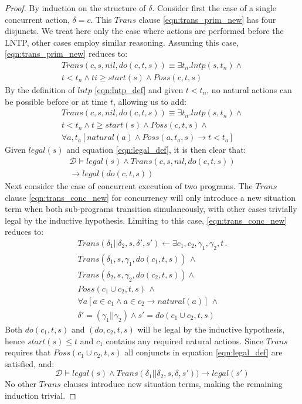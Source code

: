 \documentclass[letterpaper]{article}
\begin{document}
\begin{proof}
By induction on the structure of $\delta$.
Consider first the case of a single concurrent action, $\delta=c$.  This
$Trans$ clause \ref{eqn:trans_prim_new} has four disjuncts. We treat
here only the
case where actions are performed before the LNTP, other
cases employ similar reasoning.
Assuming this case, \ref{eqn:trans_prim_new} reduces to:
\begin{multline*}
Trans(c,s,nil,do(c,t,s)) \equiv \exists t_n . lntp(s,t_n) \wedge \\
  t < t_n \wedge ti \geq start(s) \wedge Poss(c,t,s)
\end{multline*}
By the definition of $lntp$ \ref{eqn:lntp_def} and given $t < t_n$,
no natural actions
can be possible before or at time $t$, allowing us to add:
\begin{multline*}
Trans(c,s,nil,do(c,t,s)) \equiv \exists t_n . lntp(s,t_n) \wedge \\
  t < t_n \wedge t \geq start(s) \wedge Poss(c,t,s) \wedge\\
  \forall a,t_a \left[ natural(a) \wedge Poss(a,t_a,s) \rightarrow t < t_a \right]
\end{multline*}
Given $legal(s)$ and equation \ref{eqn:legal_def}, it is then clear that:
\begin{multline*}
\mathcal{D} \models legal(s) \wedge Trans(c,s,nil,do(c,t,s))\\
\rightarrow legal(do(c,t,s))
\end{multline*}
Next consider the case of concurrent execution of two programs.  The $Trans$
clause \ref{eqn:trans_conc_new} for concurrency will only introduce a
new situation term when both
sub-programs transition simulaneously, with other cases trivially legal by
the inductive hypothesis.  Limiting to this case, \ref{eqn:trans_conc_new}
reduces to:
\begin{multline*}
Trans(\delta_{1}||\delta_{2},s,\delta',s')\leftarrow \exists c_{1},c_{2},\gamma_{1},\gamma_{2},t\,.\\
Trans(\delta_{1},s,\gamma_{1},do(c_{1},t,s))\,\wedge\\
Trans(\delta_{2},s,\gamma_{2},do(c_{2},t,s))\wedge\\
Poss(c_{1}\cup c_{2},t,s)\,\wedge\\
\forall a\left[a\in c_{1}\wedge a\in c_{2}\rightarrow natural(a)\right]\,\wedge\\
\delta'=(\gamma_{1}||\gamma_{2})\wedge s'=do(c_{1}\cup c_{2},t,s)
\end{multline*}
Both $do(c_1,t,s)$ and $(do,c_2,t,s)$ will be legal by the inductive hypothesis,
hence $start(s) \leq t$ and $c_1$ contains any required natural actions.
Since $Trans$ requires that $Poss(c_1 \cup c_2,t,s)$ all conjuncts in
equation \ref{eqn:legal_def} are satisfied, and:
\begin{equation*}
\mathcal{D} \models legal(s) \wedge Trans(\delta_1 || \delta_2,s,\delta,s'))
\rightarrow legal(s')
\end{equation*}
No other $Trans$ clauses introduce new situation terms, making
the remaining induction trivial.
\end{proof}
\end{document}
